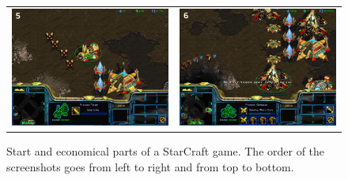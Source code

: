 \begin{figure}[!ht]
\begin{center}
\begin{tabular}{cc}
\includegraphics[width=7.8cm]{images/SC_game/SC_upgrade_attack.png} & 
\includegraphics[width=7.8cm]{images/SC_game/SC_queue_production.png}
\end{tabular}
\label{fig:SC_game1}
\caption{Start and economical parts of a StarCraft game. The order of the screenshots goes from left to right and from top to bottom.}
\end{center}
\end{figure}

